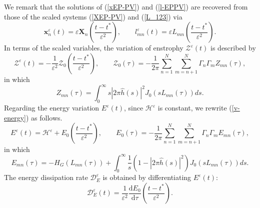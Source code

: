 \documentclass{article}
\theoremstyle{definition}
\begin{document}
We remark that the solutions of (\ref{xEP-PV}) and (\ref{l-EPPV}) are recovered from those of the scaled systems (\ref{XEP-PV}) and (\ref{L_123}) via
\begin{equation}
{\bm x}_n^\varepsilon(t) = \varepsilon {\bm X}_n \left(\frac{t - t^\ast}{\varepsilon^2} \right), \qquad l_{mn}^\varepsilon (t) = \varepsilon L_{mn} \left( \frac{t - t^\ast}{\varepsilon^2} \right).  \label{recover}
\end{equation}
In terms of the scaled variables, the variation of enstrophy $\mathscr{Z}^\varepsilon(t)$ is described by 
\begin{equation}
\mathscr{Z}^\varepsilon(t) = - \frac{1}{\varepsilon^2} \mathscr{Z}_0\left( \frac{t - t^\ast}{\varepsilon^2} \right), \qquad \mathscr{Z}_0(\tau) = - \frac{1}{2\pi} \sum_{n=1}^N \sum_{m=n+1}^N \Gamma_n \Gamma_m Z_{mn}(\tau),
\label{Z_0}
\end{equation}
in which 
\begin{equation}
Z_{mn}(\tau) = \int_0^\infty s \left\vert 2\pi\widehat{h}(s) \right\vert^2  J_0 \left( s L_{mn}(\tau) \right) ds. \label{Z_nm}
\end{equation}
Regarding the energy variation $E^\varepsilon(t)$, since $\mathscr{H}^\varepsilon$ is constant, we rewrite (\ref{v-energy}) as follows.
\begin{equation*}
E^\varepsilon(t) = \mathscr{H}^\varepsilon +  E_0\left( \frac{t - t^\ast}{\varepsilon^2} \right), \qquad E_0(\tau) = - \frac{1}{2\pi} \sum_{n=1}^N \sum_{m=n+1}^N \Gamma_n \Gamma_m E_{mn}(\tau),
\end{equation*}
in which
\begin{equation*}
E_{mn}(\tau) = - H_G\left( L_{mn}(\tau) \right) +  \int_0^\infty \frac{1}{s} \left( 1 - \left\vert 2\pi\widehat{h}(s) \right\vert^2 \right) J_0 \left( s L_{mn}(\tau) \right) ds.
\end{equation*}
The energy dissipation rate $\mathscr{D}_E^\varepsilon$ is obtained by differentiating $E^\varepsilon(t)$:
\begin{equation*}
\mathscr{D}_E^\varepsilon (t) = \frac{1}{\varepsilon^2} \frac{\mbox{d}E_0}{\mbox{d}\tau} \left( \frac{t - t^\ast}{\varepsilon^2} \right).  
\end{equation*}
\end{document}
